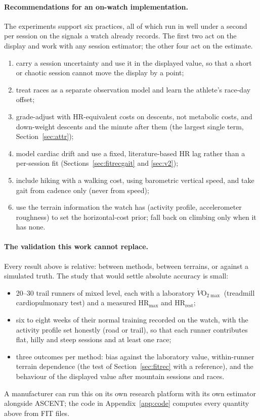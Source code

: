 \documentclass[11pt,a4paper]{article}
\newcommand{\VOmax}{\ensuremath{\dot V\mathrm{O}_{2\max}}}
\newcommand{\HRmax}{\ensuremath{\mathrm{HR}_{\max}}}
\newcommand{\HRrest}{\ensuremath{\mathrm{HR}_{\mathrm{rest}}}}
\newcommand{\ascent}{ASCENT}
\begin{document}
\paragraph{Recommendations for an on-watch implementation.} The experiments support six practices, all of which run in well under a second per session on the signals a watch already records. The first two act on the display and work with any session estimator; the other four act on the estimate.
\begin{enumerate}[label=(\roman*),leftmargin=*]
\item carry a session uncertainty and use it in the displayed value, so that a short or chaotic session cannot move the display by a point;
\item treat races as a separate observation model and learn the athlete's race-day offset;
\item grade-adjust with HR-equivalent costs on descents, not metabolic costs, and down-weight descents and the minute after them (the largest single term, Section~\ref{sec:attr});
\item model cardiac drift and use a fixed, literature-based HR lag rather than a per-session fit (Sections~\ref{sec:fitrecgait} and \ref{sec:v2});
\item include hiking with a walking cost, using barometric vertical speed, and take gait from cadence only (never from speed);
\item use the terrain information the watch has (activity profile, accelerometer roughness) to set the horizontal-cost prior; fall back on climbing only when it has none.
\end{enumerate}

\paragraph{The validation this work cannot replace.} Every result above is relative: between methods, between terrains, or against a simulated truth. The study that would settle absolute accuracy is small:
\begin{itemize}[leftmargin=*]
\item 20--30 trail runners of mixed level, each with a laboratory \VOmax{} (treadmill cardiopulmonary test) and a measured \HRmax{} and \HRrest{};
\item six to eight weeks of their normal training recorded on the watch, with the activity profile set honestly (road or trail), so that each runner contributes flat, hilly and steep sessions and at least one race;
\item three outcomes per method: bias against the laboratory value, within-runner terrain dependence (the test of Section~\ref{sec:fitrec} with a reference), and the behaviour of the displayed value after mountain sessions and races.
\end{itemize}
A manufacturer can run this on its own research platform with its own estimator alongside \ascent; the code in Appendix~\ref{app:code} computes every quantity above from FIT files.
\end{document}
